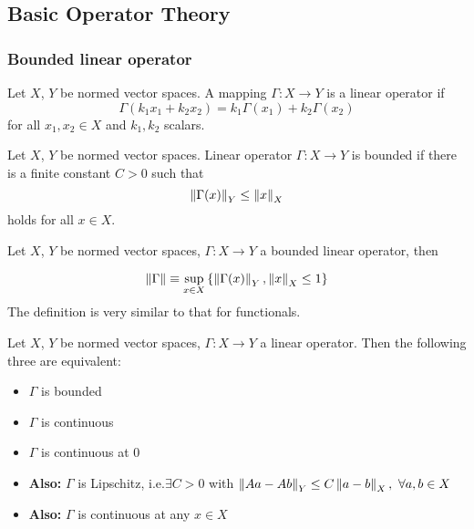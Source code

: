 \newpage
\subsection{Basic Operator Theory}
\subsubsection{Bounded linear operator}
\begin{definition}\rm\nextline
	Let $X$, $Y$ be normed vector spaces. A mapping $\Gamma:X\xrightarrow{}Y$ is a linear operator if
	$$
		\Gamma(k_1x_1+k_2x_2)=k_1\Gamma(x_1)+k_2\Gamma(x_2)
	$$
	for all $x_1,x_2\in X$ and $k_1,k_2$ scalars.
\end{definition}

\begin{definition}\label{continuity of LO}\rm\nextline
	Let $X$, $Y$ be normed vector spaces. Linear operator $\Gamma:X\xrightarrow{}Y$ is bounded if there is a finite constant $C>0$ such that
	$$
		\left\|{\Gamma(x)}\right\|_Y\leq\left\|{x}\right\|_X
	$$
	holds for all $x\in X$.
\end{definition}

\begin{definition}\label{operator norm}\rm\nextline
	Let $X$, $Y$ be normed vector spaces, $\Gamma:X\xrightarrow{}Y$ a bounded linear operator, then

	$$
		\left\|{\Gamma}\right\|\equiv\sup_{x\in X}{\left\{\left\|{\Gamma(x)}\right\|_Y,\left\|{x}\right\|_X\leq1\right\}}
	$$
	The definition is very similar to that for functionals.
\end{definition}

\begin{proposition}\rm\nextline
	Let $X$, $Y$ be normed vector spaces, $\Gamma:X\xrightarrow{}Y$ a linear operator. Then the following three are equivalent:
	\begin{itemize}
		\item $\Gamma$ is bounded
		\item $\Gamma$ is continuous
		\item $\Gamma$ is continuous at 0
		\item {\bf Also:} $\Gamma$ is Lipschitz, i.e.$\exists C>0$ with $\left\|{Aa-Ab}\right\|_Y\leq C\left\|{a-b}\right\|_X,\,\,\forall a,b\in X$
		\item {\bf Also:} $\Gamma$ is continuous at any $x\in X$

	\end{itemize}
\end{proposition}

